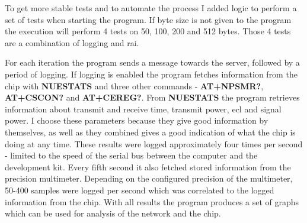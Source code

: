 \documentclass[USenglish]{ifimaster}  %
\begin{document}
\begin{table}[H]
\centering
{}
\caption[\textbf{nbiot\_labtest.py} parameters]{\textbf{nbiot\_labtest.py} parameters. See \href{https://github.com/henninghaakonsen/thesis/blob/master/code/nbiot_labtest.py}{\acrshort{nb-iot} labtest}\cite{code:nbiotlabtest} for complete code}
\label{table:labtestparameters}
\end{table}

To get more stable tests and to automate the process I added logic to perform a set of tests when starting the program. If byte size is not given to the program the execution will perform 4 tests on 50, 100, 200 and 512 bytes. Those 4 tests are a combination of logging and \acrshort{rai}.

For each iteration the program sends a message towards the server, followed by a period of logging. If logging is enabled the program fetches information from the chip with \textbf{NUESTATS} and three other commands - \textbf{AT+NPSMR?}, \textbf{AT+CSCON?} and \textbf{AT+CEREG?}. From \textbf{NUESTATS} the program retrieves information about transmit and receive time, transmit power, \acrshort{ecl} and signal power. I choose these parameters because they give good information by themselves, as well as they combined gives a good indication of what the chip is doing at any time. These results were logged approximately four times per second - limited to the speed of the serial bus between the computer and the development kit. Every fifth second it also fetched stored information from the precision multimeter. Depending on the configured precision of the multimeter, 50-400 samples were logged per second which was correlated to the logged information from the chip. With all results the program produces a set of graphs which can be used for analysis of the network and the chip.
\end{document}
